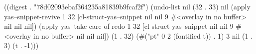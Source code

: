 
((digest . "78d02093ebaf364235a81839b9fcaf2f") (undo-list nil (32 . 33) nil (apply yas--snippet-revive 1 32 [cl-struct-yas--snippet nil nil 9 #<overlay in no buffer> nil nil nil]) (apply yas--take-care-of-redo 1 32 [cl-struct-yas--snippet nil nil 9 #<overlay in no buffer> nil nil nil]) (1 . 32) (#("pt" 0 2 (fontified t)) . 1) 3 nil (1 . 3) (t . -1)))
